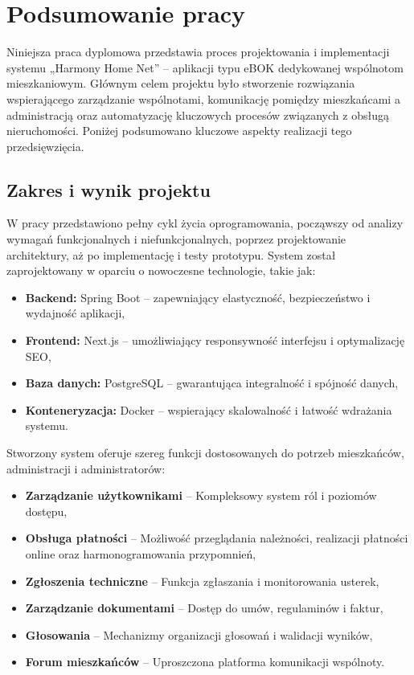 \chapter{Podsumowanie pracy}

Niniejsza praca dyplomowa przedstawia proces projektowania i implementacji systemu „Harmony Home Net” – aplikacji typu eBOK dedykowanej wspólnotom mieszkaniowym. Głównym celem projektu było stworzenie rozwiązania wspierającego zarządzanie wspólnotami, komunikację pomiędzy mieszkańcami a administracją oraz automatyzację kluczowych procesów związanych z obsługą nieruchomości. Poniżej podsumowano kluczowe aspekty realizacji tego przedsięwzięcia.

\section{Zakres i wynik projektu}
W pracy przedstawiono pełny cykl życia oprogramowania, począwszy od analizy wymagań funkcjonalnych i niefunkcjonalnych, poprzez projektowanie architektury, aż po implementację i testy prototypu. System został zaprojektowany w oparciu o nowoczesne technologie, takie jak:
\begin{itemize}
    \item \textbf{Backend:} Spring Boot -- zapewniający elastyczność, bezpieczeństwo i wydajność aplikacji,
    \item \textbf{Frontend:} Next.js -- umożliwiający responsywność interfejsu i optymalizację SEO,
    \item \textbf{Baza danych:} PostgreSQL -- gwarantująca integralność i spójność danych,
    \item \textbf{Konteneryzacja:} Docker -- wspierający skalowalność i łatwość wdrażania systemu.
\end{itemize}

Stworzony system oferuje szereg funkcji dostosowanych do potrzeb mieszkańców, administracji i administratorów:
\begin{itemize}
    \item \textbf{Zarządzanie użytkownikami} -- Kompleksowy system ról i poziomów dostępu,
    \item \textbf{Obsługa płatności} -- Możliwość przeglądania należności, realizacji płatności online oraz harmonogramowania przypomnień,
    \item \textbf{Zgłoszenia techniczne} -- Funkcja zgłaszania i monitorowania usterek,
    \item \textbf{Zarządzanie dokumentami} -- Dostęp do umów, regulaminów i faktur,
    \item \textbf{Głosowania} -- Mechanizmy organizacji głosowań i walidacji wyników,
    \item \textbf{Forum mieszkańców} -- Uproszczona platforma komunikacji wspólnoty.
\end{itemize}

